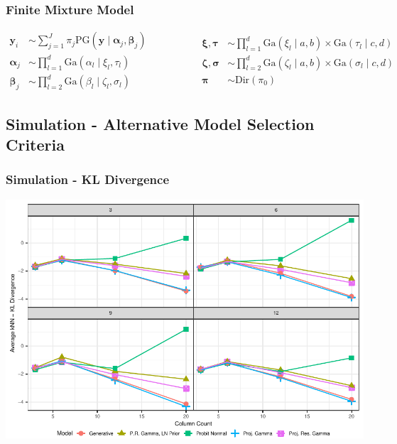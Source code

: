 \documentclass[aspectratio=169]{beamer}
\newlength{\frametextheight}
\begin{document}
\begin{frame}
  \frametitle{Finite Mixture Model}
  \begin{equation*}
    \begin{aligned}
      \bm{ y}_i &\sim \sum_{j = 1}^J\pi_j\text{PG}\left(\bm{ y}\mid \bm{ \alpha}_j, \bm{ \beta}_j\right)\\
      \bm{ \alpha}_j &\sim {\textstyle \prod}_{l = 1}^d \text{Ga}\left(\alpha_l\mid\xi_l,\tau_l\right)\\
      \bm{ \beta}_j &\sim {\textstyle \prod}_{l = 2}^d \text{Ga}\left(\beta_l\mid\zeta_l,\sigma_l\right)
    \end{aligned}
    \hspace{2cm}
    \begin{aligned}
      \bm{ \xi},\bm{\tau} &\sim {\textstyle \prod}_{l = 1}^d \text{Ga}(\xi_l\mid a,b)
                \times \text{Ga}(\tau_l\mid c,d)\\
      \bm{ \zeta},\bm{\sigma} &\sim {\textstyle\prod}_{l = 2}^d\text{Ga}(\zeta_l \mid a,b)
              \times \text{Ga}(\sigma_l\mid c,d)\\
      \bm{ \pi} &\sim \text{Dir}(\pi_0)
    \end{aligned}
  \end{equation*}
\end{frame} %

\subsection*{Simulation - Alternative Model Selection Criteria}


\begin{frame}
  \frametitle{Simulation - KL Divergence}
  \begin{center}
    \includegraphics[height=\frametextheight]{./images/simulation_knn_kld}
  \end{center}
\end{frame}
\end{document}
